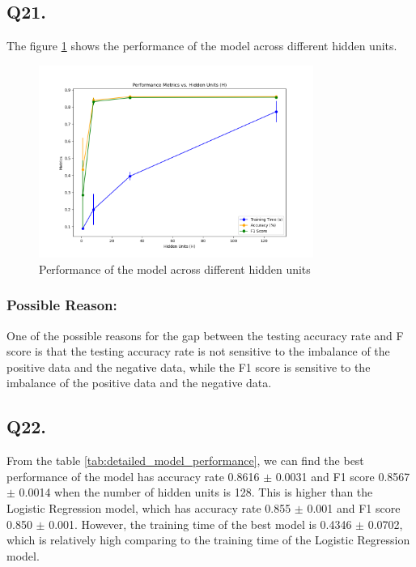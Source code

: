 \documentclass{article}
\begin{document}
\subsection*{Q21.}

The figure \ref{fig:Performance_vs_H} shows the performance of the model across different hidden units.
\begin{figure}[h!]
    \centering
    \includegraphics[width=0.8\textwidth]{./pic/Combined_Performance_vs_H.png}
    \caption{Performance of the model across different hidden units}
    \label{fig:Performance_vs_H}
\end{figure}

\subsubsection*{Possible Reason:}

One of the possible reasons for the gap between the testing accuracy rate and F score is that the testing accuracy rate is not sensitive to the imbalance of the positive data and the negative data, while the F1 score is sensitive to the imbalance of the positive data and the negative data.

\subsection*{Q22.}

From the table \ref{tab:detailed_model_performance}, we can find the best performance of the model has accuracy rate 0.8616 $\pm$ 0.0031 and F1 score 0.8567 $\pm$ 0.0014 when the number of hidden units is 128. This is higher than the Logistic Regression model, which has accuracy rate 0.855 $\pm$ 0.001 and F1 score 0.850 $\pm$ 0.001.
However, the training time of the best model is 0.4346 $\pm$ 0.0702, which is relatively high comparing to the training time of the Logistic Regression model.
\end{document}

